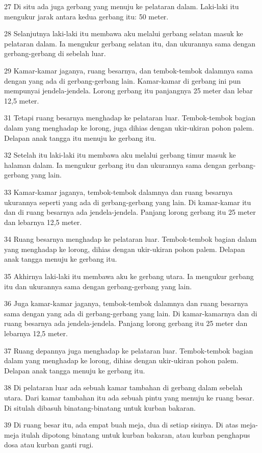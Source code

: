 \par 27 Di situ ada juga gerbang yang menuju ke pelataran dalam. Laki-laki itu mengukur jarak antara kedua gerbang itu: 50 meter.
\par 28 Selanjutnya laki-laki itu membawa aku melalui gerbang selatan masuk ke pelataran dalam. Ia mengukur gerbang selatan itu, dan ukurannya sama dengan gerbang-gerbang di sebelah luar.
\par 29 Kamar-kamar jaganya, ruang besarnya, dan tembok-tembok dalamnya sama dengan yang ada di gerbang-gerbang lain. Kamar-kamar di gerbang ini pun mempunyai jendela-jendela. Lorong gerbang itu panjangnya 25 meter dan lebar 12,5 meter.
\par 31 Tetapi ruang besarnya menghadap ke pelataran luar. Tembok-tembok bagian dalam yang menghadap ke lorong, juga dihias dengan ukir-ukiran pohon palem. Delapan anak tangga itu menuju ke gerbang itu.
\par 32 Setelah itu laki-laki itu membawa aku melalui gerbang timur masuk ke halaman dalam. Ia mengukur gerbang itu dan ukurannya sama dengan gerbang-gerbang yang lain.
\par 33 Kamar-kamar jaganya, tembok-tembok dalamnya dan ruang besarnya ukurannya seperti yang ada di gerbang-gerbang yang lain. Di kamar-kamar itu dan di ruang besarnya ada jendela-jendela. Panjang lorong gerbang itu 25 meter dan lebarnya 12,5 meter.
\par 34 Ruang besarnya menghadap ke pelataran luar. Tembok-tembok bagian dalam yang menghadap ke lorong, dihias dengan ukir-ukiran pohon palem. Delapan anak tangga menuju ke gerbang itu.
\par 35 Akhirnya laki-laki itu membawa aku ke gerbang utara. Ia mengukur gerbang itu dan ukurannya sama dengan gerbang-gerbang yang lain.
\par 36 Juga kamar-kamar jaganya, tembok-tembok dalamnya dan ruang besarnya sama dengan yang ada di gerbang-gerbang yang lain. Di kamar-kamarnya dan di ruang besarnya ada jendela-jendela. Panjang lorong gerbang itu 25 meter dan lebarnya 12,5 meter.
\par 37 Ruang depannya juga menghadap ke pelataran luar. Tembok-tembok bagian dalam yang menghadap ke lorong, dihias dengan ukir-ukiran pohon palem. Delapan anak tangga menuju ke gerbang itu.
\par 38 Di pelataran luar ada sebuah kamar tambahan di gerbang dalam sebelah utara. Dari kamar tambahan itu ada sebuah pintu yang menuju ke ruang besar. Di situlah dibasuh binatang-binatang untuk kurban bakaran.
\par 39 Di ruang besar itu, ada empat buah meja, dua di setiap sisinya. Di atas meja-meja itulah dipotong binatang untuk kurban bakaran, atau kurban penghapus dosa atau kurban ganti rugi.
